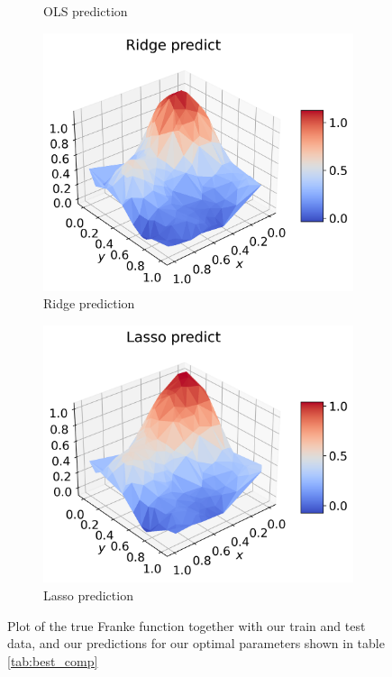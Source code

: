 \documentclass[12pt]{article}
\begin{document}
\begin{figure}[H]
\begin{subfigure}{.5\textwidth}
    \caption{OLS prediction}
    \label{fig:pred_ols}
  \end{subfigure}
  \begin{subfigure}{.5\textwidth}
    \centering
    \includegraphics[width=\textwidth]{../figures/ridge_pred_franke_2.png}
    \caption{Ridge prediction}
    \label{fig:pred_ridge}
  \end{subfigure}
  \begin{subfigure}{.5\textwidth}
    \centering
    \includegraphics[width=\textwidth]{../figures/lasso_pred_franke_2.png}
    \caption{Lasso prediction}
    \label{fig:pred_lasso}
  \end{subfigure}
  \caption{Plot of the true Franke function together with our train and test data, and our predictions for our optimal parameters shown in table \ref{tab:best_comp} }
  \label{fig:pred_franke}
\end{figure}
\end{document}
